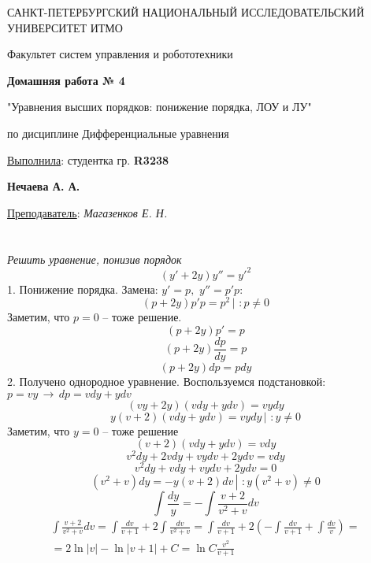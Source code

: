 \documentclass[a5paper, 10pt]{article}
\theoremstyle{definition}
\theoremstyle{plain}
\theoremstyle{remark}
\newcommand*{\titlePage}{
	\thispagestyle{title}
	\begingroup
	\begin{center}
		\vspace*{6ex}
		
		{\small
			САНКТ-ПЕТЕРБУРГСКИЙ НАЦИОНАЛЬНЫЙ ИССЛЕДОВАТЕЛЬСКИЙ УНИВЕРСИТЕТ ИТМО	
		}
		
		\vspace*{2ex}
		
		{\normalsize
			Факультет систем управления и робототехники
		}
		
		\vspace*{15ex}
		
		{\Large \bfseries 
			Домашняя работа № 4
		}
\vspace*{2ex}
	{\Large \bfseries 
			
"Уравнения высших порядков: понижение порядка, ЛОУ и ЛУ"
		}
\vspace*{2ex}
		
		{\normalsize
			по дисциплине Дифференциальные уравнения
		}

	\end{center}
	\vspace*{20ex}
	\begin{flushright}
		{\large 
			\underline{Выполнила}: студентка гр. \textbf{R3238}\\
			\begin{flushright}
				\textbf{Нечаева А. А.}\\
			\end{flushright}
		}
		
		\vspace*{5ex}
		
		{\large 
			\underline{Преподаватель}: \textit{Магазенков Е. Н.}
		}
	\end{flushright}	
	\newpage
	\setcounter{page}{1}
	\endgroup}
\begin{document}
	\titlePage
	\pagestyle{style}
\newpage
\section{}
\textit{Решить уравнение, понизив порядок}
\\
\begin{equation}
\left( y' + 2y \right) y'' = y'^2
\end{equation}
1. Понижение порядка. Замена: $y'=p, \, \, y''=p'p$:
\begin{equation}
\left( p + 2y \right) p'p = p^2 \, \left|\, \, : p \neq 0 \right.
\end{equation}
Заметим, что $p=0$ -- тоже решение.
\begin{equation}
\left( p + 2y \right) p' = p
\end{equation}
\begin{equation}
\left( p + 2y \right) \frac{dp}{dy} = p
\end{equation}
\begin{equation}
\left( p + 2y \right) dp = pdy
\end{equation}
2. Получено однородное уравнение. Воспользуемся подстановкой: $p = vy \, \to \, dp=vdy+ydv$
\begin{equation}
\left( vy + 2y \right) \left(  vdy+ydv \right) =  vydy
\end{equation}
\begin{equation}
y\left( v + 2 \right) \left(  vdy+ydv \right) =  vydy  \, \left|\, \, : y \neq 0 \right.
\end{equation}
Заметим, что $y=0$ -- тоже решение
\begin{equation}
\left( v + 2 \right) \left(  vdy+ydv \right) =  vdy 
\end{equation}
\begin{equation}
v^2dy+2vdy+vydv+2ydv=vdy
\end{equation}
\begin{equation}
v^2dy+vdy+vydv+2ydv=0
\end{equation}
\begin{equation}
(v^2+v)dy=-y(v+2)dv  \, \left|\, \, : y (v^2+v) \neq 0 \right.
\end{equation}
\begin{equation}
\int \frac{dy}{y} = -\int \frac{v+2}{v^2+v}dv
\end{equation}
\begin{multline}
\int \frac{v+2}{v^2+v}dv = \int \frac{dv}{v+1} + 2\int \frac{dv}{v^2+v} = \int \frac{dv}{v+1} + 2\left(-\int \frac{dv}{v+1}+ \int \frac{dv}{v} \right) = \\
= 2 \ln |v| - \ln |v+1| + C = \ln C \frac{v^2}{v+1}
\end{multline}
\end{document}
